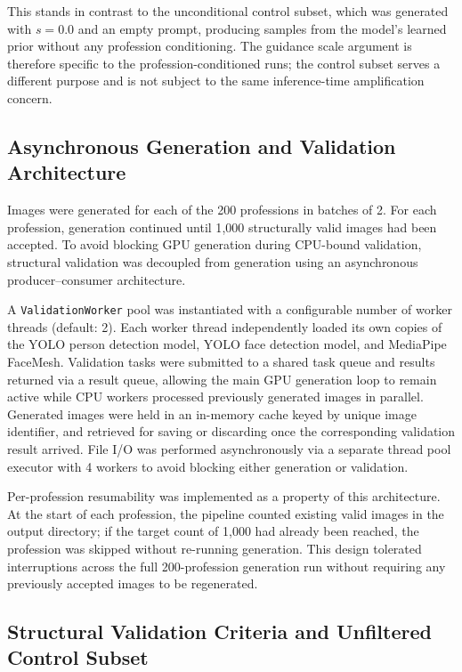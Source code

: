 This stands in contrast to the unconditional control subset, which was
generated with $s = 0.0$ and an empty prompt, producing samples from the
model's learned prior without any profession conditioning. The guidance
scale argument is therefore specific to the profession-conditioned runs;
the control subset serves a different purpose and is not subject to the
same inference-time amplification concern.

\subsection{Asynchronous Generation and Validation Architecture}
\label{subsec:async_architecture}

Images were generated for each of the 200 professions in batches of 2. For
each profession, generation continued until 1{,}000 structurally valid
images had been accepted. To avoid blocking GPU generation during
CPU-bound validation, structural validation was decoupled from generation
using an asynchronous producer--consumer architecture.

A \texttt{ValidationWorker} pool was instantiated with a configurable
number of worker threads (default: 2). Each worker thread independently
loaded its own copies of the YOLO person detection model, YOLO face
detection model, and MediaPipe FaceMesh. Validation tasks were submitted to
a shared task queue and results returned via a result queue, allowing the
main GPU generation loop to remain active while CPU workers processed
previously generated images in parallel. Generated images were held in an
in-memory cache keyed by unique image identifier, and retrieved for saving
or discarding once the corresponding validation result arrived. File I/O
was performed asynchronously via a separate thread pool executor with 4
workers to avoid blocking either generation or validation.

Per-profession resumability was implemented as a property of this
architecture. At the start of each profession, the pipeline counted
existing valid images in the output directory; if the target count of
1{,}000 had already been reached, the profession was skipped without
re-running generation. This design tolerated interruptions across the full
200-profession generation run without requiring any previously accepted
images to be regenerated.

\subsection{Structural Validation Criteria and Unfiltered Control Subset}
\label{subsec:structural_validation}

